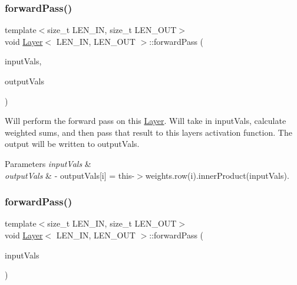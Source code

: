\subsubsection{\texorpdfstring{forward\+Pass()}{forwardPass()}\hspace{0.1cm}{\footnotesize\ttfamily [1/2]}}
{\footnotesize\ttfamily template$<$size\+\_\+t L\+E\+N\+\_\+\+IN, size\+\_\+t L\+E\+N\+\_\+\+O\+UT$>$ \\
void \hyperlink{class_layer}{Layer}$<$ L\+E\+N\+\_\+\+IN, L\+E\+N\+\_\+\+O\+UT $>$\+::forward\+Pass (\begin{DoxyParamCaption}\item[{array$<$ double, L\+E\+N\+\_\+\+IN $>$ $\ast$}]{input\+Vals,  }\item[{array$<$ double, L\+E\+N\+\_\+\+O\+UT $>$ $\ast$}]{output\+Vals }\end{DoxyParamCaption})\hspace{0.3cm}{\ttfamily [inline]}}

Will perform the forward pass on this \hyperlink{class_layer}{Layer}. Will take in {\ttfamily input\+Vals}, calculate weighted sums, and then pass that result to this layer\textquotesingle{}s activation function. The output will be written to {\ttfamily output\+Vals}. 
\begin{DoxyParams}{Parameters}
{\em input\+Vals} & \\
\hline
{\em output\+Vals} & -\/ output\+Vals\mbox{[}i\mbox{]} = this-\/$>$weights.\+row(i).inner\+Product(input\+Vals). \\
\hline
\end{DoxyParams}
\mbox{\label{class_layer_a5f09327f0ab9f2d5b0d8fbe3e7994714}} 
\subsubsection{\texorpdfstring{forward\+Pass()}{forwardPass()}\hspace{0.1cm}{\footnotesize\ttfamily [2/2]}}
{\footnotesize\ttfamily template$<$size\+\_\+t L\+E\+N\+\_\+\+IN, size\+\_\+t L\+E\+N\+\_\+\+O\+UT$>$ \\
void \hyperlink{class_layer}{Layer}$<$ L\+E\+N\+\_\+\+IN, L\+E\+N\+\_\+\+O\+UT $>$\+::forward\+Pass (\begin{DoxyParamCaption}\item[{array$<$ double, L\+E\+N\+\_\+\+IN $>$ $\ast$}]{input\+Vals }\end{DoxyParamCaption})\hspace{0.3cm}{\ttfamily [inline]}}


